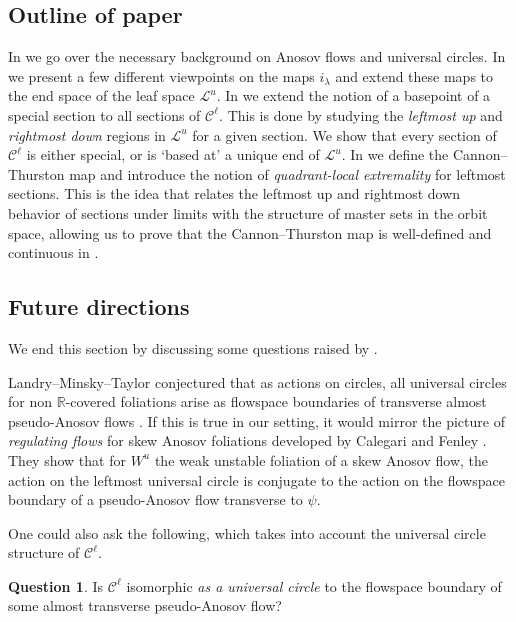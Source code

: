 \documentclass[11pt]{amsart}
\newcommand{\R}{\mathbb{R}}
\renewcommand{\l}{\lambda}
\newcommand{\mc}{\mathcal}
\numberwithin{equation}{section}
\theoremstyle{definition}
\newtheorem{question}[equation]{Question}
\begin{document}
\subsection*{Outline of paper}
In  we go over the necessary background on Anosov flows and universal circles. In  we present a few different viewpoints on the maps $i_\l$ and extend these maps to the end space of the leaf space $\mc L^u$. In  we extend the notion of a basepoint of a special section to all sections of $\mc C^\ell$. This is done by studying the \emph{leftmost up} and \emph{rightmost down} regions in $\mc L^u$ for a given section. We show that every section of $\mc C^\ell$ is either special, or is `based at' a unique end of $\mc L^u$. In  we define the Cannon--Thurston map and introduce the notion of \emph{quadrant-local extremality} for leftmost sections. This is the idea that relates the leftmost up and rightmost down behavior of sections under limits with the structure of master sets in the orbit space, allowing us to prove that the Cannon--Thurston map is well-defined and continuous in .

\subsection*{Future directions}
We end this section by discussing some questions raised by . 



Landry--Minsky--Taylor conjectured that as actions on circles, all universal circles for non $\R$-covered foliations arise as flowspace boundaries of transverse almost pseudo-Anosov flows \cite[Conjecture 1.5]{LMT_UC}. If this is true in our setting, it would mirror the picture of \emph{regulating flows} for skew Anosov foliations developed by Calegari \cite{Calegari2000Rcovered} and Fenley \cite{fenley2002foliations}. They show that for $W^u$ the weak unstable foliation of a skew Anosov flow, the action on the leftmost universal circle is conjugate to the action on the flowspace boundary of a pseudo-Anosov flow transverse to $\psi$. 

One could also ask the following, which takes into account the universal circle structure of $\mc C^\ell$.

\begin{question}\label{q:from_a_flow_uc}
	Is $\mc C^\ell$ isomorphic \emph{as a universal circle} to the flowspace boundary of some almost transverse pseudo-Anosov flow?
\end{question}
\end{document}
